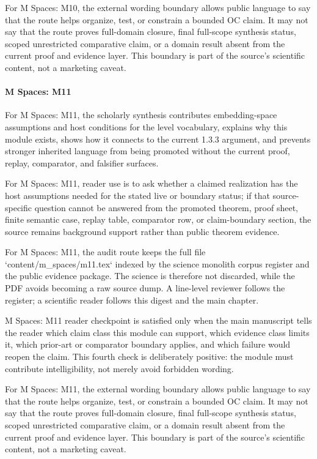 For M Spaces: M10, the external wording boundary allows public language to say that the route helps organize, test, or constrain a bounded OC claim. It may not say that the route proves full-domain closure, final full-scope synthesis status, scoped unrestricted comparative claim, or a domain result absent from the current proof and evidence layer. This boundary is part of the source's scientific content, not a marketing caveat.


\paragraph{M Spaces: M11}

For M Spaces: M11, the scholarly synthesis contributes embedding-space assumptions and host conditions for the level vocabulary, explains why this module exists, shows how it connects to the current 1.3.3 argument, and prevents stronger inherited language from being promoted without the current proof, replay, comparator, and falsifier surfaces.


For M Spaces: M11, reader use is to ask whether a claimed realization has the host assumptions needed for the stated live or boundary status; if that source-specific question cannot be answered from the promoted theorem, proof sheet, finite semantic case, replay table, comparator row, or claim-boundary section, the source remains background support rather than public theorem evidence.


For M Spaces: M11, the audit route keeps the full file `content/m\_spaces/m11.tex` indexed by the science monolith corpus register and the public evidence package. The science is therefore not discarded, while the PDF avoids becoming a raw source dump. A line-level reviewer follows the register; a scientific reader follows this digest and the main chapter.


M Spaces: M11 reader checkpoint is satisfied only when the main manuscript tells the reader which claim class this module can support, which evidence class limits it, which prior-art or comparator boundary applies, and which failure would reopen the claim. This fourth check is deliberately positive: the module must contribute intelligibility, not merely avoid forbidden wording.


For M Spaces: M11, the external wording boundary allows public language to say that the route helps organize, test, or constrain a bounded OC claim. It may not say that the route proves full-domain closure, final full-scope synthesis status, scoped unrestricted comparative claim, or a domain result absent from the current proof and evidence layer. This boundary is part of the source's scientific content, not a marketing caveat.


